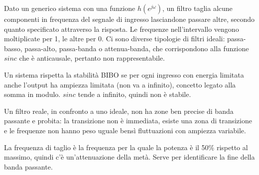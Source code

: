 Dato un generico sistema con una funzione $h(e^{j\omega})$, un filtro taglia alcune componenti in frequenza del segnale di ingresso lasciandone passare altre, secondo quanto specificato attraverso la risposta. Le frequenze nell'intervallo vengono moltiplicate per 1, le altre per 0. Ci sono diverse tipologie di filtri ideali: passa-basso, passa-alto, passa-banda o attenua-banda, che corrispondono alla funzione $sinc$ che è anticausale, pertanto non rappresentabile. 

Un sistema rispetta la stabilità BIBO se per ogni ingresso con energia limitata anche l'output ha ampiezza limitata (non va a infinito), concetto legato alla somma in modulo. $sinc$ tende a infinito, quindi non è stabile. 

Un filtro reale, in confronto a uno ideale, non ha zone ben precise di banda passante e probita: la transizione non è immediata, esiste una zona di transizione e le frequenze non hanno peso uguale bensì fluttuazioni con ampiezza variabile. 

La frequenza di taglio è la frequenza per la quale la potenza è il 50\% rispetto al massimo, quindi c'è un'attenuazione della metà. Serve per identificare la fine della banda passante.
